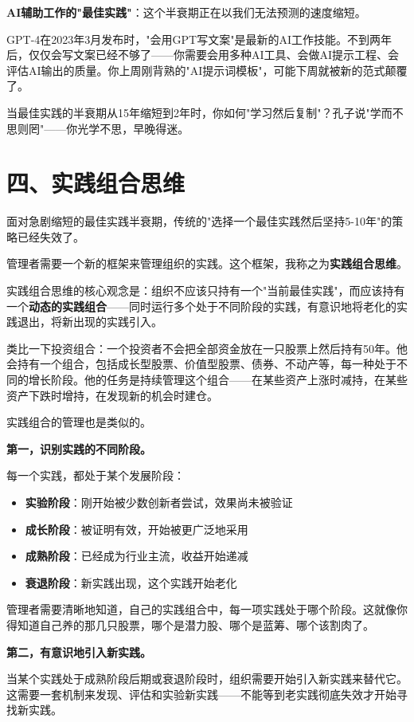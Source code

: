 \textbf{AI辅助工作的"最佳实践"}：这个半衰期正在以我们无法预测的速度缩短。

GPT-4在2023年3月发布时，"会用GPT写文案"是最新的AI工作技能。不到两年后，仅仅会写文案已经不够了——你需要会用多种AI工具、会做AI提示工程、会评估AI输出的质量。你上周刚背熟的"AI提示词模板"，可能下周就被新的范式颠覆了。

当最佳实践的半衰期从15年缩短到2年时，你如何"学习然后复制"？孔子说"学而不思则罔"——你光学不思，早晚得迷。

\section{四、实践组合思维}


面对急剧缩短的最佳实践半衰期，传统的"选择一个最佳实践然后坚持5-10年"的策略已经失效了。

管理者需要一个新的框架来管理组织的实践。这个框架，我称之为\textbf{实践组合思维}。

实践组合思维的核心观念是：组织不应该只持有一个"当前最佳实践"，而应该持有一个\textbf{动态的实践组合}——同时运行多个处于不同阶段的实践，有意识地将老化的实践退出，将新出现的实践引入。

类比一下投资组合：一个投资者不会把全部资金放在一只股票上然后持有50年。他会持有一个组合，包括成长型股票、价值型股票、债券、不动产等，每一种处于不同的增长阶段。他的任务是持续管理这个组合——在某些资产上涨时减持，在某些资产下跌时增持，在发现新的机会时建仓。

实践组合的管理也是类似的。

\textbf{第一，识别实践的不同阶段。}

每一个实践，都处于某个发展阶段：

\begin{itemize}
\item \textbf{实验阶段}：刚开始被少数创新者尝试，效果尚未被验证
\item \textbf{成长阶段}：被证明有效，开始被更广泛地采用
\item \textbf{成熟阶段}：已经成为行业主流，收益开始递减
\item \textbf{衰退阶段}：新实践出现，这个实践开始老化

\end{itemize}
管理者需要清晰地知道，自己的实践组合中，每一项实践处于哪个阶段。这就像你得知道自己养的那几只股票，哪个是潜力股、哪个是蓝筹、哪个该割肉了。

\textbf{第二，有意识地引入新实践。}

当某个实践处于成熟阶段后期或衰退阶段时，组织需要开始引入新实践来替代它。这需要一套机制来发现、评估和实验新实践——不能等到老实践彻底失效才开始寻找新实践。

